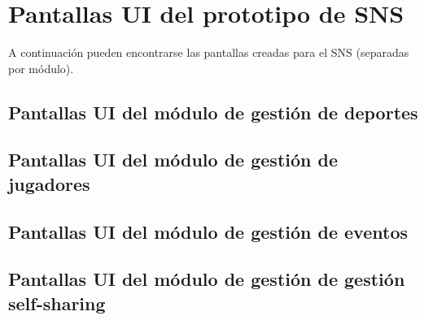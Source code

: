 \chapter{Pantallas UI del prototipo de SNS}
\label{app:ui}

A continuación pueden encontrarse las pantallas creadas para el SNS (separadas por módulo).

\section{Pantallas UI del módulo de gestión de deportes}

\clearpage

\section{Pantallas UI del módulo de gestión de jugadores}

\clearpage

\section{Pantallas UI del módulo de gestión de eventos}

\clearpage

\section{Pantallas UI del módulo de gestión de gestión self-sharing}

\clearpage

